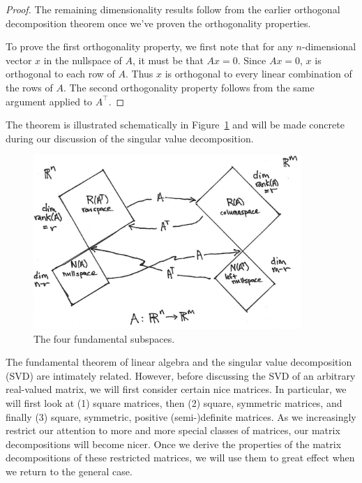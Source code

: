 \documentclass[]{article}
\theoremstyle{plain}
\theoremstyle{definition}
\theoremstyle{remark}
\begin{document}
\begin{proof}
The remaining dimensionality results follow from the earlier orthogonal decomposition
theorem once we've proven the orthogonality properties.

To prove the first orthogonality property, we first note that for any $n$-dimensional
vector $x$ in the nullspace of $A$, it must be that $Ax = 0$.  Since $Ax = 0$,
$x$ is orthogonal to each row of $A$.  Thus $x$ is orthogonal to every linear
combination of the rows of $A$.  The second orthogonality property follows from
the same argument applied to $A^\top$.
\end{proof}

The theorem is illustrated schematically in Figure~\ref{fig:fourspaces} and
will be made concrete during our discussion of the singular value decomposition.

\begin{figure}
  \begin{centering}
    \includegraphics[width=4in]{fig/4-spaces.png}\par
  \end{centering}
  \caption{\label{fig:fourspaces}The four fundamental subspaces.}
\end{figure}

The fundamental theorem of linear algebra and the singular value decomposition
(SVD) are intimately related.  However, before discussing the SVD of an
arbitrary real-valued matrix, we will first consider certain nice matrices.
In particular, we will first look at (1) square matrices, then (2) square,
symmetric matrices, and finally (3) square, symmetric, positive (semi-)definite
matrices.  As we increasingly restrict our attention to more and more special
classes of matrices, our matrix decompositions will become nicer. Once we
derive the properties of the matrix decompositions of these restricted
matrices, we will use them to great effect when we return to the general case.
\end{document}
